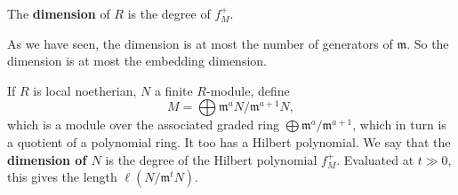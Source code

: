 \begin{definition} 
The \textbf{dimension} of $R$ is the degree of $f_M^+$. 
\end{definition} 

\begin{remark} 
As we have seen, the dimension is at most the number of generators of
$\mathfrak{m}$. So the dimension is at most the embedding dimension.
\end{remark} 


\begin{definition} 
If $R$ is local noetherian, $N$ a finite $R$-module, define 
\[ M = \bigoplus \mathfrak{m}^a N / \mathfrak{m}^{a+1} N, \]
which is a module over the associated graded ring $\bigoplus
\mathfrak{m}^a/\mathfrak{m}^{a+1}$, which in turn is a quotient of a polynomial
ring. It too has a Hilbert polynomial. We say that the \textbf{dimension of
$N$} is the degree of the Hilbert polynomial $f_{M}^+$. Evaluated at $t \gg 0$,
this gives the length $\ell(N/ \mathfrak{m}^t N)$.
\end{definition} 

